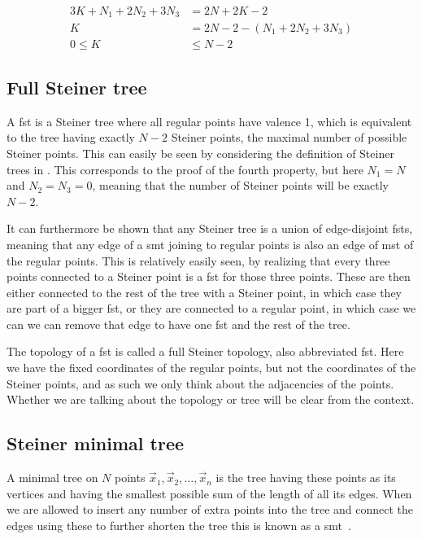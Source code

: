 \begin{align}
  3K + N_1 + 2N_2 + 3N_3 &= 2N + 2K - 2 \\
  K &= 2N - 2 - (N_1 + 2N_2 + 3N_3) \\
  0 \le K &\le N - 2
\end{align}

\subsection{Full Steiner tree}
\label{sec:full-steiner-tree}

A \gls{fst} is a Steiner tree where all regular points have valence 1, which is
equivalent to the tree having exactly $N-2$ Steiner points, the maximal number
of possible Steiner points. This can easily be seen by considering the
definition of Steiner trees in . This corresponds to the
proof of the fourth property, but here $N_1 = N$ and $N_2 = N_3 = 0$, meaning
that the number of Steiner points will be exactly $N-2$.

It can furthermore be shown that any Steiner tree is a union of edge-disjoint
\glspl{fst}, meaning that any edge of a \gls{smt} joining to regular points is also
an edge of \gls{mst} of the regular points. This is relatively easily seen, by
realizing that every three points connected to a Steiner point is a \gls{fst} for
those three points. These are then either connected to the rest of the tree with
a Steiner point, in which case they are part of a bigger \gls{fst}, or they are
connected to a regular point, in which case we can we can remove that edge to
have one \gls{fst} and the rest of the tree.

The topology of a \gls{fst} is called a full Steiner topology, also abbreviated
\gls{fst}. Here we have the fixed coordinates of the regular points, but not the
coordinates of the Steiner points, and as such we only think about the
adjacencies of the points. Whether we are talking about the topology or tree
will be clear from the context.

\subsection{Steiner minimal tree}
\label{sec:steiner-minimal-tree}

A minimal tree on $N$ points $\vec{x}_{1},\vec{x}_{2},\ldots,\vec{x}_{n}$ is the
tree having these points as its vertices and having the smallest possible sum of
the length of all its edges. When we are allowed to insert any number of extra
points into the tree and connect the edges using these to further shorten the
tree this is known as a \gls{smt}~\cite{Gilbert1968}.

